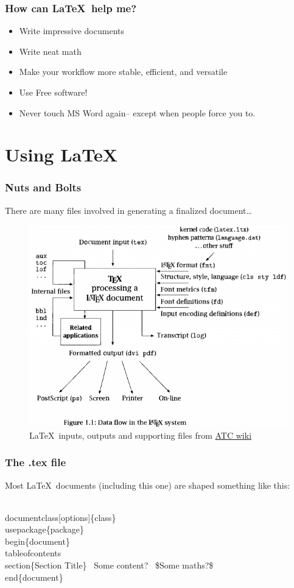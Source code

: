 \documentclass{beamer}
\begin{document}
\begin{frame}
\frametitle{How can \LaTeX\ help me?}
\begin{itemize}
\item{Write impressive documents}
\item{Write neat math}
\item{Make your workflow more stable, efficient, and versatile }
\item{Use Free software!}
\item{Never touch MS Word again-- except when people force you to.}
\end{itemize}
\end{frame}

\section{Using  \LaTeX }

\begin{frame}
\frametitle{Nuts and Bolts}
There are many files involved in generating a finalized document\dots
\begin{figure}
	\includegraphics[scale = 0.3]{latex_dataflow.png}
	\caption{\tiny{\LaTeX\ inputs, outputs and supporting files from \href{https://webhost1.ust.hk/~atcwiki/cgi-bin/atcwiki/index.php?title=ATC:LaTeX}{ATC wiki}}}
\end{figure}
\end{frame}

\begin{frame}[fragile]
	\frametitle{The .tex file}
	Most \LaTeX\ documents (including this one) are shaped something like this:
		\begin{semiverbatim}
			\\documentclass[options]\{class\}
			\\usepackage\{package\}
			\\begin\{document\}
			\\tableofcontents
			\\section\{Section Title\}
		\-\	Some content?
		\-\	\$Some maths?\$
			\\end\{document\}
		\end{semiverbatim}
\end{frame}
\end{document}
